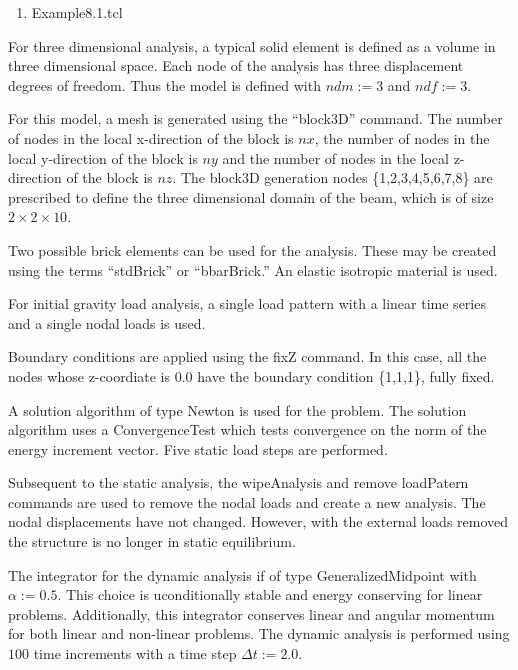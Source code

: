 \documentclass[12pt]{article}
\begin{document}
\vspace{0.2in}  
\begin{enumerate} 
\item Example8.1.tcl
\end{enumerate}

\vspace{0.2in} 


For three dimensional analysis, a typical solid element is defined as a volume 
in three dimensional space.  Each node of the analysis has three displacement
degrees of freedom.  Thus the model is defined with 
$ndm := 3$ and $ndf := 3$.

For this model, a mesh is generated using the ``block3D'' command.  The number of 
nodes in the local x-direction of the block is $nx$,
the number of nodes in the local y-direction of the block is $ny$
and the number of nodes in the local z-direction of the block is $nz$.
The block3D generation nodes \{1,2,3,4,5,6,7,8\} are prescribed to define 
the three dimensional domain of the beam, which is of size $2\times2\times10$.

Two possible brick elements can be used for the analysis.
These may be created using the terms
``stdBrick'' or
``bbarBrick.''  
An elastic isotropic material is used.

For initial gravity load analysis, a single load pattern 
with a linear time series and a single nodal loads is used. 

Boundary conditions are applied using the fixZ command.  In this case, 
all the nodes whose z-coordiate is $0.0$ have the boundary condition
\{1,1,1\}, fully fixed.

\vspace{0.2in}

A solution algorithm of type Newton is used for the 
problem. The solution algorithm uses a ConvergenceTest which tests
convergence on the norm of the energy increment vector. 
Five static load steps are performed.

Subsequent to the static analysis, the wipeAnalysis and 
remove loadPatern commands are used 
to remove the nodal loads and create a new analysis.  The nodal 
displacements have not changed.  However, with the external loads removed
the structure is no longer in static equilibrium.

The integrator for the dynamic analysis if of type 
GeneralizedMidpoint with $\alpha := 0.5$.  This choice 
is uconditionally stable and energy conserving for linear problems.
Additionally, this integrator conserves linear and
angular momentum for both linear and non-linear problems.
The dynamic analysis is performed using $100$ time increments with
a time step $\Delta t := 2.0$.
\end{document}
